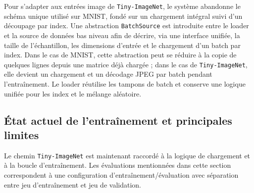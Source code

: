 \documentclass[a4paper,11pt,oneside]{article}
\begin{document}
Pour s'adapter aux entrées image de \texttt{Tiny-ImageNet}, le système abandonne le schéma unique utilisé sur MNIST, fondé sur un chargement intégral suivi d'un découpage par index. Une abstraction \texttt{BatchSource} est introduite entre le loader et la source de données bas niveau afin de décrire, via une interface unifiée, la taille de l'échantillon, les dimensions d'entrée et le chargement d'un batch par index. Dans le cas de MNIST, cette abstraction peut se réduire à la copie de quelques lignes depuis une matrice déjà chargée ; dans le cas de \texttt{Tiny-ImageNet}, elle devient un chargement et un décodage JPEG par batch pendant l'entraînement. Le loader réutilise les tampons de batch et conserve une logique unifiée pour les index et le mélange aléatoire.

\subsection{État actuel de l'entraînement et principales limites}

Le chemin \texttt{Tiny-ImageNet} est maintenant raccordé à la logique de chargement et à la boucle d'entraînement. Les évaluations mentionnées dans cette section correspondent à une configuration d'entraînement/évaluation avec séparation entre jeu d'entraînement et jeu de validation.
\end{document}
